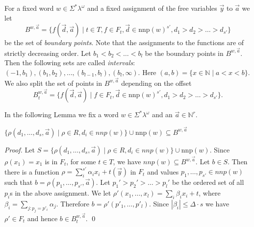 \documentclass[envcountsame]{llncs}
\newcommand{\Nat}{\mathbb{N}}
\newcommand{\nnp}{\mathrm{nnp}}
\begin{document}
For a fixed word $w \in \Sigma^*\lambda^{\omega}$ and a fixed assignment of the free variables $\vec y$ to $\vec a$ we let 
$$B^{w,\vec a}=\{f(\vec d,\vec a)\mid t \in T, f\in F_t, \vec d \in\nnp(w)^{s'},d_1>d_2>\dots>d_{s'}\}$$
be the set of {\em boundary points}. Note that the assignments to the functions are of strictly decreasing order. Let $b_1<b_2<\ldots<b_l$ be the boundary points 
in $B^{w,\vec a}$. Then the following sets are called \emph{intervals}: $(-1,b_1),(b_1,b_2),\dots,(b_{l-1},b_l),(b_l,\infty)$. Here 
$(a,b) = \{x \in \Nat \mid a<x<b\}$.
We also split the set of points in $B^{w,\vec a}$ depending on the offset
$$B_t^{w,\vec a}=\{f(\vec d,\vec a)\mid f\in F_t,\vec d \in\nnp(w)^{s'},d_1>d_2>\dots>d_{s'}\}.$$



In the following Lemma we fix a word $w \in \Sigma^*\lambda^{\omega}$ and an $\vec a \in \Nat^r$.
\begin{lemma}\label{bplemma}
$\{\rho(d_1,\ldots,d_s,\vec a) \mid \rho \in R, d_i \in nnp(w)\} \cup \nnp(w) \subseteq B^{w,\vec a}$
\end{lemma}
\begin{proof}
Let $S=\{\rho(d_1,\ldots,d_s,\vec a) \mid \rho \in R, d_i \in nnp(w)\} \cup \nnp(w)$. 
Since $\rho(x_1)=x_1$ is in $F_t$, for some $t\in T$, we have $nnp(w) \subseteq B^{w,\vec a}$. Let $b\in S$. Then there is a function
$\rho=\sum_i^{s'} \alpha_i x_i+t(\vec y)$ in $F_t$ and values $p_1,\dots,p_{s'}\in nnp(w)$ such that $b=\rho(p_1,\dots,p_{s'},\vec a)$. Let $p_1'> p_2' >\dots>p_l'$ be the ordered set of all $p_i$s in the above assignment. We let $\rho'(x_1,\dots,x_l)=\sum_i \beta_{i} x_i+t$, where 
$\beta_i=\sum_{j:p_j=p'_i} \alpha_j$. Therefore $b=\rho'(p'_1,\dots,p'_l)$.
Since $|\beta_i|\leq \Delta\cdot s$ we have $\rho'\in F_t$ and hence $b\in B^{w,\vec a}_t$.
\qed \end{proof}
\end{document}
